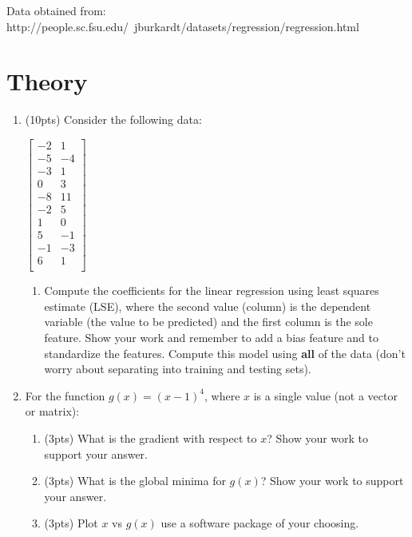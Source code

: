 \documentclass[12pt]{article}
\begin{document}
\noindent
Data obtained from:  http://people.sc.fsu.edu/~jburkardt/datasets/regression/regression.html

\newpage
\section{Theory}
\begin{enumerate}
\item   (10pts) Consider the following data:\\
\begin{center}
$
 \begin{bmatrix}
	-2 & 1\\
	-5 & -4\\	
	-3 & 1\\
	0 & 3\\
	-8 & 11\\
	-2 & 5\\
	1 & 0\\
	5 & -1\\
	-1 & -3\\
	6 & 1\\
\end{bmatrix}
$
\end{center}
	\begin{enumerate}
	\item Compute the coefficients for the linear regression using least squares estimate (LSE), where the second value (column) is the dependent variable (the value to be predicted) and the first column is the sole feature.  Show your work and remember to add a bias feature and to standardize the features.  Compute this model using \textbf{all} of the data (don't worry about separating into training and testing sets).\\
	\end{enumerate}
	
\item For the function $g(x)=(x-1)^4$, where $x$ is a single value (not a vector or matrix):
\begin{enumerate}
\item (3pts) What is the gradient with respect to $x$?  Show your work to support your answer.
\item (3pts) What is the global minima for $g(x)$?  Show your work to support your answer.
\item (3pts) Plot $x$ vs $g(x)$ use a software package of your choosing.
\end{enumerate}

\end{enumerate}
\end{document}
